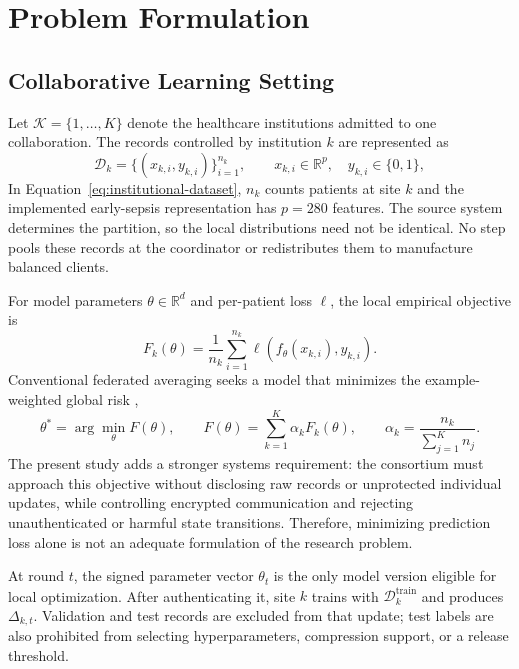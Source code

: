 \section{Problem Formulation}
\label{sec:problem-formulation}

\subsection{Collaborative Learning Setting}
\label{subsec:collaborative-setting}

Let $\mathcal{K}=\{1,\ldots,K\}$ denote the healthcare institutions admitted to one collaboration. The records controlled by institution $k$ are represented as
\begin{equation}
    \mathcal{D}_k=\{(x_{k,i},y_{k,i})\}_{i=1}^{n_k},
    \qquad x_{k,i}\in\mathbb{R}^{p},\quad y_{k,i}\in\{0,1\},
    \label{eq:institutional-dataset}
\end{equation}
In Equation~\ref{eq:institutional-dataset}, $n_k$ counts patients at site $k$ and the implemented early-sepsis representation has $p=280$ features. The source system determines the partition, so the local distributions need not be identical. No step pools these records at the coordinator or redistributes them to manufacture balanced clients.

For model parameters $\theta\in\mathbb{R}^{d}$ and per-patient loss $\ell$, the local empirical objective is
\begin{equation}
    F_k(\theta)=\frac{1}{n_k}\sum_{i=1}^{n_k}
    \ell\!\left(f_{\theta}(x_{k,i}),y_{k,i}\right).
    \label{eq:local-empirical-risk}
\end{equation}
Conventional federated averaging seeks a model that minimizes the example-weighted global risk \cite{mcmahan2017fedavg},
\begin{equation}
    \theta^{*}=\arg\min_{\theta}F(\theta),
    \qquad
    F(\theta)=\sum_{k=1}^{K}\alpha_kF_k(\theta),
    \qquad
    \alpha_k=\frac{n_k}{\sum_{j=1}^{K}n_j}.
    \label{eq:global-federated-objective}
\end{equation}
The present study adds a stronger systems requirement: the consortium must approach this objective without disclosing raw records or unprotected individual updates, while controlling encrypted communication and rejecting unauthenticated or harmful state transitions. Therefore, minimizing prediction loss alone is not an adequate formulation of the research problem.

At round $t$, the signed parameter vector $\theta_t$ is the only model version eligible for local optimization. After authenticating it, site $k$ trains with $\mathcal{D}_k^{\mathrm{train}}$ and produces $\Delta_{k,t}$. Validation and test records are excluded from that update; test labels are also prohibited from selecting hyperparameters, compression support, or a release threshold.

